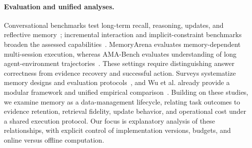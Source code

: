 \paragraph{Evaluation and unified analyses.}
Conversational benchmarks test long-term recall, reasoning, updates, and reflective memory~\citep{mrw_locomo,mrw_longmemeval,mrw_membench}; incremental interaction and implicit-constraint benchmarks broaden the assessed capabilities~\citep{mrw_memoryagentbench,mrw_locomo_plus}. MemoryArena evaluates memory-dependent multi-session execution, whereas AMA-Bench evaluates understanding of long agent-environment trajectories~\citep{mrw_memoryarena,mrw_amabench}. These settings require distinguishing answer correctness from evidence recovery and successful action. Surveys systematize memory designs and evaluation protocols~\citep{mrw_survey2024,mrw_survey}, and Wu et al. already provide a modular framework and unified empirical comparison~\citep{mrw_memoryeab}. Building on these studies, we examine memory as a data-management lifecycle, relating task outcomes to evidence retention, retrieval fidelity, update behavior, and operational cost under a shared execution protocol. Our focus is explanatory analysis of these relationships, with explicit control of implementation versions, budgets, and online versus offline computation.

